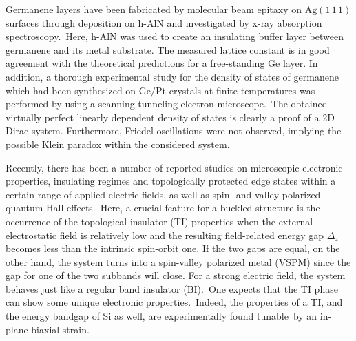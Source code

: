 \documentclass[aps,prb,showpacs]{revtex4}
\begin{document}
Germanene layers have been fabricated by molecular beam epitaxy on $\mathrm{Ag}(1\,1\,1)$ surfaces
through deposition on h-AlN and investigated 
by x-ray absorption spectroscopy.\,\cite{R2} 
Here, h-AlN was used to create an insulating buffer layer between germanene and its metal substrate. 
The measured lattice constant is in good agreement with the 
theoretical predictions for a free-standing Ge layer. In addition, a thorough experimental study for the density of states of germanene
which had been synthesized on Ge$/$Pt crystals at finite temperatures was performed by using a scanning-tunneling electron microscope.\,\cite{R3} 
The obtained virtually perfect linearly dependent density of states is clearly a proof of a 
2D Dirac system. Furthermore, Friedel oscillations were not observed, implying the possible Klein paradox within the considered system.
\medskip

Recently, there has been a number of reported studies on microscopic electronic properties, insulating regimes and 
topologically protected edge states within a certain range of applied electric fields, as well as spin- and valley-polarized quantum
Hall effects.\,\cite{Dru4,Dru5,Dru6,TabNicPRL,TabNicACDC,TabNicMagneto} Here, a crucial feature for a buckled structure is the occurrence 
of the topological-insulator (TI) properties when the external electrostatic field is relatively low and the resulting
field-related energy gap $\Delta_z$ becomes less than the intrinsic spin-orbit one. If the two gaps are equal, on the other hand,
the system turns into a spin-valley polarized metal (VSPM) since the gap for one of the two subbands will close. For a strong electric field, the system behaves just like a regular band insulator (BI).\,\cite{SilMain, ezawa}
One expects that the TI phase can show some unique electronic properties.\,\cite{Qi, Hasan} Indeed,
the properties of a TI, and the energy bandgap of Si as well, are experimentally found tunable\,\cite{R21} 
by an in-plane biaxial strain.
\medskip
\end{document}

